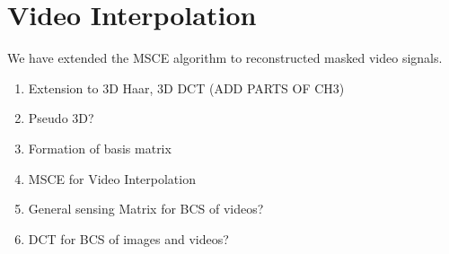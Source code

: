 \chapter{Video Interpolation}
We have extended the MSCE algorithm to reconstructed masked video signals.

\begin{enumerate}
\item Extension to 3D Haar, 3D DCT (ADD PARTS OF CH3)
\item Pseudo 3D?
\item Formation of basis matrix
\item MSCE for Video Interpolation
\item General sensing Matrix for BCS of videos?
\item DCT for BCS of images and videos?

\end{enumerate}
